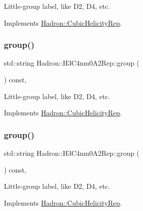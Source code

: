 Little-\/group label, like D2, D4, etc. 

Implements \mbox{\hyperlink{structHadron_1_1CubicHelicityRep_a101a7d76cd8ccdad0f272db44b766113}{Hadron\+::\+Cubic\+Helicity\+Rep}}.

\mbox{\label{structHadron_1_1H3C4nm0A2Rep_a645f15ec66163ba3a04123eb5456f42d}} 
\subsubsection{\texorpdfstring{group()}{group()}\hspace{0.1cm}{\footnotesize\ttfamily [3/5]}}
{\footnotesize\ttfamily std\+::string Hadron\+::\+H3\+C4nm0\+A2\+Rep\+::group (\begin{DoxyParamCaption}{ }\end{DoxyParamCaption}) const\hspace{0.3cm}{\ttfamily [inline]}, {\ttfamily [virtual]}}

Little-\/group label, like D2, D4, etc. 

Implements \mbox{\hyperlink{structHadron_1_1CubicHelicityRep_a101a7d76cd8ccdad0f272db44b766113}{Hadron\+::\+Cubic\+Helicity\+Rep}}.

\mbox{\label{structHadron_1_1H3C4nm0A2Rep_a645f15ec66163ba3a04123eb5456f42d}} 
\subsubsection{\texorpdfstring{group()}{group()}\hspace{0.1cm}{\footnotesize\ttfamily [4/5]}}
{\footnotesize\ttfamily std\+::string Hadron\+::\+H3\+C4nm0\+A2\+Rep\+::group (\begin{DoxyParamCaption}{ }\end{DoxyParamCaption}) const\hspace{0.3cm}{\ttfamily [inline]}, {\ttfamily [virtual]}}

Little-\/group label, like D2, D4, etc. 

Implements \mbox{\hyperlink{structHadron_1_1CubicHelicityRep_a101a7d76cd8ccdad0f272db44b766113}{Hadron\+::\+Cubic\+Helicity\+Rep}}.

